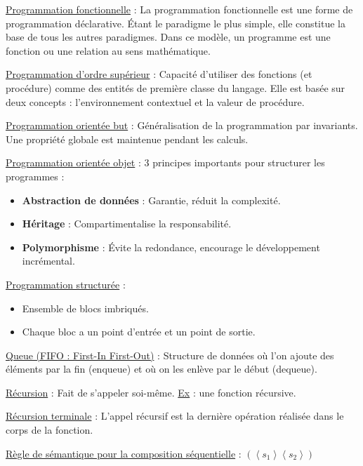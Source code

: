 \documentclass[fr,license=none]{../../../eplsummary}
\begin{document}
\begin{flushleft}
\textcolor{mauvedef}{\underline{Programmation fonctionnelle}} : La programmation fonctionnelle est une forme de programmation déclarative. Étant le paradigme le plus simple, elle constitue la base de tous les autres paradigmes. Dans ce modèle, un programme est une fonction ou une relation au sens mathématique.\bigbreak


\textcolor{mauvedef}{\underline{Programmation d'ordre supérieur}} : Capacité d'utiliser des fonctions (et procédure) comme des entités de première classe du langage. Elle est basée sur deux concepts : l'environnement contextuel et la valeur de procédure. \bigbreak


\textcolor{mauvedef}{\underline{Programmation orientée but}} : Généralisation de la programmation par invariants. Une propriété globale est maintenue pendant les calculs. \bigbreak


\textcolor{mauvedef}{\underline{Programmation orientée objet}} : 3 principes importants pour structurer les programmes :
\begin{itemize}
\item \textbf{Abstraction de données} : Garantie, réduit la complexité.
\item \textbf{Héritage} : Compartimentalise la responsabilité.
\item \textbf{Polymorphisme} : Évite la redondance, encourage le développement incrémental.
\end{itemize}\bigbreak


\textcolor{mauvedef}{\underline{Programmation structurée}} :
\begin{itemize}
\item Ensemble de blocs imbriqués.
\item Chaque bloc a un point d'entrée et un point de sortie.
\end{itemize}\bigbreak



\textcolor{mauvedef}{\underline{Queue (FIFO : First-In First-Out)}} : Structure de données où l’on ajoute des éléments par la fin (enqueue) et où on les enlève par le début (dequeue). \bigbreak


\textcolor{mauvedef}{\underline{Récursion}} : Fait de s'appeler soi-même. \underline{Ex} : une fonction récursive. \bigbreak


\textcolor{mauvedef}{\underline{Récursion terminale}} : L'appel récursif est la dernière opération réalisée dans le corps de la fonction. \bigbreak



\textcolor{mauvedef}{\underline{Règle de sémantique pour la composition séquentielle}} : \textcolor{miorangerouge}{$( \left\langle s_1 \right\rangle \left\langle s_2 \right\rangle )$}


\end{flushleft}
\end{document}
